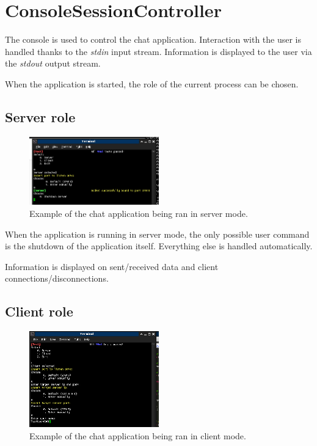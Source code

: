 \documentclass{report}
\begin{document}
        \section{ConsoleSessionController}
            
            The console is used to control the chat application. 
            Interaction with the user is handled thanks to the \emph{stdin} input stream.
            Information is displayed to the user via the \emph{stdout} output stream.

            When the application is started, the role of the current process can be chosen.

            \subsection{Server role}

                \begin{figure}[h]
                \caption{Example of the chat application being ran in server mode.}
                \centering
                \includegraphics[width=0.5\textwidth]{screen1}
                \end{figure}

                When the application is running in server mode, the only possible user command is the shutdown of the application itself.
                Everything else is handled automatically.

                Information is displayed on sent/received data and client connections/disconnections.

\newpage

            \subsection{Client role}
        
                \begin{figure}[h]
                \caption{Example of the chat application being ran in client mode.}
                \centering
                \includegraphics[width=0.5\textwidth]{screen2}
                \end{figure}
\end{document}

